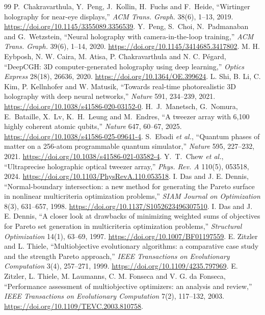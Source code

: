 \begin{thebibliography}{99}
 P.~Chakravarthula, Y.~Peng, J.~Kollin, H.~Fuchs and F.~Heide, ``Wirtinger holography for near-eye displays,'' \emph{ACM Trans. Graph.} 38(6), 1--13, 2019. \url{https://doi.org/10.1145/3355089.3356539}.
 Y.~Peng, S.~Choi, N.~Padmanaban and G.~Wetzstein, ``Neural holography with camera-in-the-loop training,'' \emph{ACM Trans. Graph.} 39(6), 1--14, 2020. \url{https://doi.org/10.1145/3414685.3417802}.
 M. H. Eybposh, N. W. Caira, M. Atisa, P. Chakravarthula and N. C. P\'egard, ``DeepCGH: 3D computer-generated holography using deep learning,'' \emph{Optics Express} 28(18), 26636, 2020. \url{https://doi.org/10.1364/OE.399624}.
 L. Shi, B. Li, C. Kim, P. Kellnhofer and W. Matusik, ``Towards real-time photorealistic 3D holography with deep neural networks,'' \emph{Nature} 591, 234--239, 2021. \url{https://doi.org/10.1038/s41586-020-03152-0}.
 H.~J.~Manetsch, G.~Nomura, E.~Bataille, X.~Lv, K.~H.~Leung and M.~Endres, ``A tweezer array with 6,100 highly coherent atomic qubits,'' \emph{Nature} 647, 60--67, 2025. \url{https://doi.org/10.1038/s41586-025-09641-4}.
 S.~Ebadi \emph{et al.}, ``Quantum phases of matter on a 256-atom programmable quantum simulator,'' \emph{Nature} 595, 227--232, 2021. \url{https://doi.org/10.1038/s41586-021-03582-4}.
 Y.~T.~Chew \emph{et al.}, ``Ultraprecise holographic optical tweezer array,'' \emph{Phys. Rev. A} 110(5), 053518, 2024. \url{https://doi.org/10.1103/PhysRevA.110.053518}.
 I. Das and J. E. Dennis, ``Normal-boundary intersection: a new method for generating the Pareto surface in nonlinear multicriteria optimization problems,'' \emph{SIAM Journal on Optimization} 8(3), 631--657, 1998. \url{https://doi.org/10.1137/S1052623496307510}.
 I. Das and J. E. Dennis, ``A closer look at drawbacks of minimizing weighted sums of objectives for Pareto set generation in multicriteria optimization problems,'' \emph{Structural Optimization} 14(1), 63--69, 1997. \url{https://doi.org/10.1007/BF01197559}.
 E. Zitzler and L. Thiele, ``Multiobjective evolutionary algorithms: a comparative case study and the strength Pareto approach,'' \emph{IEEE Transactions on Evolutionary Computation} 3(4), 257--271, 1999. \url{https://doi.org/10.1109/4235.797969}.
 E. Zitzler, L. Thiele, M. Laumanns, C. M. Fonseca and V. G. da Fonseca, ``Performance assessment of multiobjective optimizers: an analysis and review,'' \emph{IEEE Transactions on Evolutionary Computation} 7(2), 117--132, 2003. \url{https://doi.org/10.1109/TEVC.2003.810758}.

\end{thebibliography}
